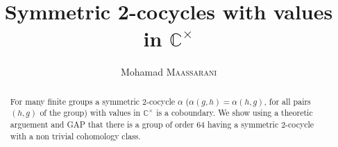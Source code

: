 \documentclass[12pt, reqno]{amsart}
\begin{document}
 
\title{Symmetric 2-cocycles with values in $\mathbb{C}^\times$}

 


 
\author{Mohamad \textsc{Maassarani} }
\maketitle
\begin{abstract} For many finite groups a symmetric $2$-cocycle $\alpha$ ($\alpha(g,h)=\alpha(h,g)$, for all pairs $(h,g)$ of the group) with values in $\mathbb{C}^\times$ is a coboundary. We show using a theoretic arguement and GAP that there is a group of order $64$ having a symmetric $2$-cocycle with a non trivial cohomology class.
\end{abstract}
\end{document}
